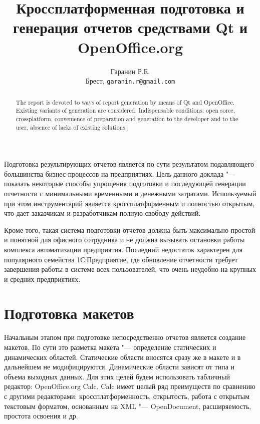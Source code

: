 \documentclass[10pt, a5paper]{article}
\begin{document}
\title{Кросcплатформенная подготовка и генерация отчетов средствами Qt и OpenOffice.org}
\author{Гаранин Р.Е.
\\
\small Брест, \texttt{garanin.r@gmail.com}
}
\maketitle

\begin{abstract}
The report is devoted to ways of report generation by means of Qt and OpenOffice. Existing
variants of generation are con\-si\-dered. Indispensable conditions: open
sorce, crossplatform,
con\-ve\-nience of preparation and generation to the developer and to the
user, absence of lacks of existing solutions.


\end{abstract}

Подготовка результирующих отчетов является по сути результатом подавляющего большинства бизнес-процессов на предприятиях. Цель данного доклада "--- показать некоторые способы упрощения подготовки и последующей генерации отчетности с минимальными временными и денежными затратами. Используемый при этом инструментарий является кроссплатформенным и полностью открытым, что дает заказчикам и разработчикам полную свободу действий.

Кроме того, такая система подготовки отчетов должна быть максимально простой и понятной для офисного сотрудника и не должна вызывать остановки работы комплекса автоматизации предприятия. Последний недостаток характерен для популярного семейства 1С:Предприятие, где обновление отчетности требует завершения работы в системе всех пользователей, что очень неудобно на крупных и средних предприятиях.

\section*{Подготовка макетов}
Начальным этапом при подготовке непосредственно отчетов является создание макетов. По сути это разметка макета "--- определение статических и динамических областей. Статические области вносятся сразу же в макете и в дальнейшем не модифицируются. Динамические области зависят от типа и объема выходных данных. Для этих целей будем использовать табличный редактор: OpenOffice.org Calc. Calc имеет целый ряд преимуществ по сравнению с другими редакторами: кроссплатформенность, открытость, работа с открытым текстовым форматом, основанным на XML "--- OpenDocument, расширяемость, простота освоения и др.
\end{document}
